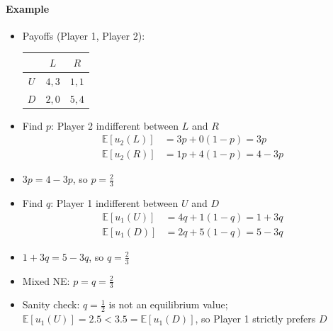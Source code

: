 \paragraph{Example}
\begin{itemize}
    \item Payoffs (Player 1, Player 2):
          \begin{center}
              \begin{tabular}{c|c|c}
                      & $L$   & $R$   \\ \hline
                  $U$ & $4,3$ & $1,1$ \\ \hline
                  $D$ & $2,0$ & $5,4$ \\
              \end{tabular}
          \end{center}
    \item Find $p$: Player 2 indifferent between $L$ and $R$
          \begin{align*}
              \mathbb{E}[u_2(L)] & = 3p + 0(1-p) = 3p   \\
              \mathbb{E}[u_2(R)] & = 1p + 4(1-p) = 4-3p
          \end{align*}
    \item $3p = 4-3p$, so $\boxed{p=\frac{2}{3}}$
    \item Find $q$: Player 1 indifferent between $U$ and $D$
          \begin{align*}
              \mathbb{E}[u_1(U)] & = 4q + 1(1-q) = 1+3q \\
              \mathbb{E}[u_1(D)] & = 2q + 5(1-q) = 5-3q
          \end{align*}
    \item $1+3q = 5-3q$, so $\boxed{q=\frac{2}{3}}$
    \item Mixed NE: $p=q=\frac{2}{3}$
    \item Sanity check: $q=\frac{1}{2}$ is not an equilibrium value; $\mathbb{E}[u_1(U)]=2.5 < 3.5=\mathbb{E}[u_1(D)]$, so Player 1 strictly prefers $D$
\end{itemize}


